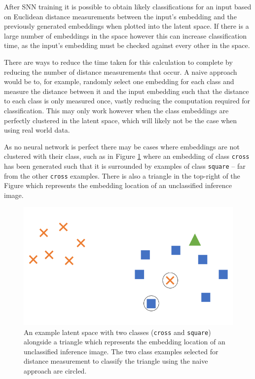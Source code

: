 After SNN training it is possible to obtain likely classifications for an input based on Euclidean distance measurements between the input's embedding and the previously generated embeddings when plotted into the latent space. If there is a large number of embeddings in the space however this can increase classification time, as the input's embedding must be checked against every other in the space. 

There are ways to reduce the time taken for this calculation to complete by reducing the number of distance measurements that occur. A naive approach would be to, for example, randomly select one embedding for each class and measure the distance between it and the input embedding such that the distance to each class is only measured once, vastly reducing the computation required for classification. This may only work however when the class embeddings are perfectly clustered in the latent space, which will likely not be the case when using real world data.

As no neural network is perfect there may be cases where embeddings are not clustered with their class, such as in Figure \ref{fig:naive-embedding-example} where an embedding of class \texttt{cross} has been generated such that it is surrounded by examples of class \texttt{square} -- far from the other \texttt{cross} examples. There is also a triangle in the top-right of the Figure which represents the embedding location of an unclassified inference image. 

 \begin{figure}[h]
	\begin{center}
		\includegraphics[scale=0.5]{Chapter5/figs/naive-embedding-example.png}
	\end{center}
	\caption{An example latent space with two classes (\texttt{cross} and \texttt{square}) alongside a triangle which represents the embedding location of an unclassified inference image. The two class examples selected for distance measurement to classify the triangle using the naive approach are circled.}
	\label{fig:naive-embedding-example}
\end{figure}

